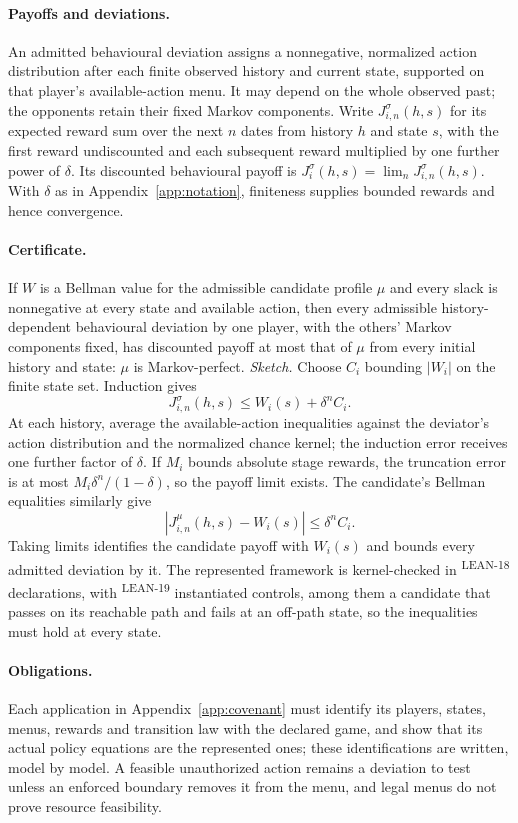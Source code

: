 \documentclass[pdflatex,sn-basic]{sn-jnl}%
\newcommand{\rec}[1]{\ifannotated\textsuperscript{\textcolor{blue!60!black}{\tiny#1}}\fi}
\begin{document}
\begin{appendices}
\paragraph{Payoffs and deviations.} An admitted behavioural deviation assigns a nonnegative, normalized action distribution after each finite observed history and current state, supported on that player's available-action menu. It may depend on the whole observed past; the opponents retain their fixed Markov components. Write $J_{i,n}^{\sigma}(h,s)$ for its expected reward sum over the next $n$ dates from history $h$ and state $s$, with the first reward undiscounted and each subsequent reward multiplied by one further power of $\delta$. Its discounted behavioural payoff is $J_i^\sigma(h,s)=\lim_n J_{i,n}^{\sigma}(h,s)$. With $\delta$ as in Appendix~\ref{app:notation}, finiteness supplies bounded rewards and hence convergence.

\paragraph{Certificate.} If $W$ is a Bellman value for the admissible candidate profile $\mu$ and every slack is nonnegative at every state and available action, then every admissible history-dependent behavioural deviation by one player, with the others' Markov components fixed, has discounted payoff at most that of $\mu$ from every initial history and state: $\mu$ is Markov-perfect. \emph{Sketch.} Choose $C_i$ bounding $|W_i|$ on the finite state set. Induction gives
\[
J_{i,n}^{\sigma}(h,s)\le W_i(s)+\delta^n C_i.
\]
At each history, average the available-action inequalities against the deviator's action distribution and the normalized chance kernel; the induction error receives one further factor of $\delta$. If $M_i$ bounds absolute stage rewards, the truncation error is at most $M_i\delta^n/(1-\delta)$, so the payoff limit exists. The candidate's Bellman equalities similarly give
\[
|J_{i,n}^{\mu}(h,s)-W_i(s)|\le\delta^n C_i.
\]
Taking limits identifies the candidate payoff with $W_i(s)$ and bounds every admitted deviation by it. The represented framework is kernel-checked in \numLeanDEighteenGeneric\rec{LEAN-18} declarations, with \numLeanDEighteenControls\rec{LEAN-19} instantiated controls, among them a candidate that passes on its reachable path and fails at an off-path state, so the inequalities must hold at every state.

\paragraph{Obligations.} Each application in Appendix~\ref{app:covenant} must identify its players, states, menus, rewards and transition law with the declared game, and show that its actual policy equations are the represented ones; these identifications are written, model by model. A feasible unauthorized action remains a deviation to test unless an enforced boundary removes it from the menu, and legal menus do not prove resource feasibility.

\end{appendices}
\end{document}
